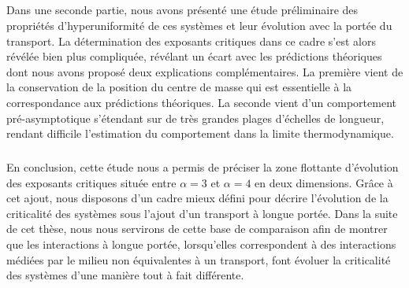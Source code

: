 \subparagraph{}Dans une seconde partie, nous avons présenté une étude préliminaire des propriétés d'hyperuniformité de ces systèmes et leur évolution avec la portée du transport. La détermination des exposants critiques dans ce cadre s'est alors révélée bien plus compliquée, révélant un écart avec les prédictions théoriques dont nous avons proposé deux explications complémentaires. La première vient de la conservation de la position du centre de masse qui est essentielle à la correspondance aux prédictions théoriques. La seconde vient d'un comportement pré-asymptotique s'étendant sur de très grandes plages d'échelles de longueur, rendant difficile l'estimation du comportement dans la limite thermodynamique.

\subparagraph{}En conclusion, cette étude nous a permis de préciser la zone flottante d'évolution des exposants critiques située entre $\alpha=3$ et $\alpha = 4$ en deux dimensions. Grâce à cet ajout, nous disposons d'un cadre mieux défini pour décrire l'évolution de la criticalité des systèmes sous l'ajout d'un transport à longue portée. Dans la suite de cet thèse, nous nous servirons de cette base de comparaison afin de montrer que les interactions à longue portée, lorsqu'elles correspondent à des interactions médiées par le milieu non équivalentes à un transport, font évoluer la criticalité des systèmes d'une manière tout à fait différente.
